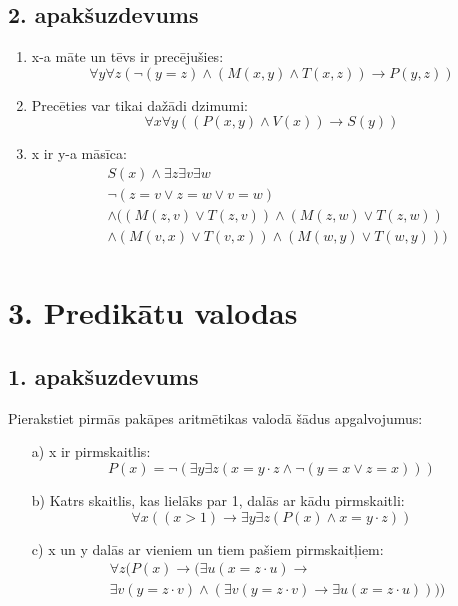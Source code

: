 \documentclass{article}
\begin{document}
\subsection*{2. apakšuzdevums}

\begin{enumerate}
    \item x-a māte un tēvs ir precējušies:
          \[
              \forall y \forall z (\neg(y = z) \land (M(x, y) \land T(x, z)) \rightarrow P(y, z))
          \]

    \item Precēties var tikai dažādi dzimumi:
          \[
              \forall x \forall y ((P(x, y) \land V(x)) \rightarrow S(y))
          \]

    \item x ir y-a māsīca:
          \begin{align*}
               & S(x) \land \exists z \exists v \exists w                    \\
               & \neg (z = v \lor z = w \lor v = w)                          \\
               & \land ((M(z, v) \lor T(z, v)) \land (M(z, w) \lor T(z, w))  \\
               & \land (M(v, x) \lor T(v, x)) \land  (M(w, y) \lor T(w, y))) \\
          \end{align*}
\end{enumerate}

\pagebreak

\section*{3. Predikātu valodas}

\subsection*{1. apakšuzdevums}

Pierakstiet pirmās pakāpes aritmētikas valodā šādus apgalvojumus:

\begin{enumerate}
    \item[a)] x ir pirmskaitlis:
        \[
            P(x) = \neg (\exists y \exists z (x = y \cdot z \land \neg (y = x \lor z = x)))
        \]

    \item[b)] Katrs skaitlis, kas lielāks par 1, dalās ar kādu pirmskaitli:
        \[
            \forall x ((x > 1) \rightarrow \exists y \exists z (P(x) \land x = y \cdot z))
        \]

    \item[c)] x un y dalās ar vieniem un tiem pašiem pirmskaitļiem:
        \begin{align*}
             & \forall z (P(x) \rightarrow (\exists u (x = z \cdot u) \rightarrow                                  \\
             & \exists v (y = z \cdot v) \land (\exists v (y = z \cdot v) \rightarrow \exists u (x = z \cdot u))))
        \end{align*}
\end{enumerate}
\end{document}
